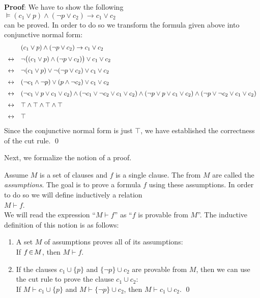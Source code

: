 \noindent
\textbf{Proof}:  We have to show the following \\[0.2cm]
\hspace*{1.3cm} $\models (c_1 \vee p) \wedge (\neg p \vee c_2) \rightarrow c_1 \vee c_2$ \\[0.2cm]
can be proved.  In order to do so we transform the formula given above into conjunctive normal form:
$$
\begin{array}{ll}
  & (c_1 \vee p) \wedge (\neg p \vee c_2) \rightarrow c_1 \vee c_2  \\[0.2cm]
\leftrightarrow  & 
    \neg \bigl( (c_1 \vee p) \wedge (\neg p \vee c_2) \bigr) \vee c_1 \vee c_2 \\[0.2cm]
\leftrightarrow  & 
    \neg (c_1 \vee p) \vee \neg (\neg p \vee c_2) \vee c_1 \vee c_2 \\[0.2cm]
\leftrightarrow  & 
     (\neg c_1 \wedge \neg p) \vee  (p \wedge \neg c_2) \vee c_1 \vee c_2 \\[0.2cm]
\leftrightarrow  & 
     (\neg c_1 \vee p \vee c_1 \vee c_2)  \wedge 
     (\neg c_1 \vee \neg c_2 \vee c_1 \vee c_2)  \wedge 
     (\neg p \vee p \vee c_1 \vee c_2)  \wedge 
     (\neg p \vee \neg c_2 \vee c_1 \vee c_2) 
      \\[0.2cm]
\leftrightarrow  & 
     \top  \wedge 
     \top  \wedge 
     \top  \wedge 
     \top 
      \\[0.2cm]
\leftrightarrow  & 
     \top    
\end{array}
$$
Since the conjunctive normal form is just $\top$, we have established the correctness of the cut rule.
\qed

Next, we formalize the notion of a proof.

\begin{Definition}
Assume $M$ is a set of clauses and $f$ is a single clause.  
The \formulae from $M$ are called the \emph{assumptions}.  The goal is to prove a formula $f$ using
these assumptions.
In order to do so we will define inductively a relation
\\[0.2cm]
\hspace*{1.3cm} 
$M \vdash f$. 
\\[0.2cm]
We will read the expression ``$M \vdash f$'' as ``$f$ is provable from $M$''.  The inductive
definition of this notion is as follows:
\begin{enumerate}
\item A set $M$ of assumptions proves all of its assumptions: \\[0.2cm]
      \hspace*{1.3cm} 
      If $f \!\in\! M$, then  $M \vdash f$.
\item If the clauses $c_1 \cup \{p\}$ and $\{ \neg p \} \cup c_2$ are provable from $M$,  then we
      can use the cut rule to prove the clause $c_1 \cup c_2$: \\[0.2cm]
      \hspace*{1.3cm} 
      If $M \vdash c_1 \cup \{p\}$ and $M \vdash \{ \neg p \} \cup c_2$, then $M \vdash c_1 \cup c_2$.
\qed
\end{enumerate}
\end{Definition}



